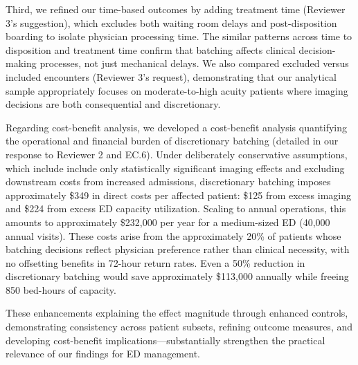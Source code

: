 \documentclass[11pt]{article}
\newcommand{\1}{\hbox{\rm 1\kern-.35em 1}}
\begin{document}
Third, we refined our time-based outcomes by adding treatment time (Reviewer 3's suggestion), which excludes both waiting room delays and post-disposition boarding to isolate physician processing time. The similar patterns across time to disposition and treatment time confirm that batching affects clinical decision-making processes, not just mechanical delays. We also compared excluded versus included encounters (Reviewer 3's request), demonstrating that our analytical sample appropriately focuses on moderate-to-high acuity patients where imaging decisions are both consequential and discretionary.

Regarding cost-benefit analysis, we developed a cost-benefit analysis quantifying the operational and financial burden of discretionary batching (detailed in our response to Reviewer 2 and EC.6). Under deliberately conservative assumptions, which include include only statistically significant imaging effects and excluding downstream costs from increased admissions, discretionary batching imposes approximately \$349 in direct costs per affected patient: \$125 from excess imaging and \$224 from excess ED capacity utilization. Scaling to annual operations, this amounts to approximately \$232,000 per year for a medium-sized ED (40,000 annual visits). These costs arise from the approximately 20\% of patients whose batching decisions reflect physician preference rather than clinical necessity, with no offsetting benefits in 72-hour return rates. Even a 50\% reduction in discretionary batching would save approximately \$113,000 annually while freeing 850 bed-hours of capacity.

These enhancements explaining the effect magnitude through enhanced controls, demonstrating consistency across patient subsets, refining outcome measures, and developing cost-benefit implications—substantially strengthen the practical relevance of our findings for ED management.

\color{black}
\end{document}
